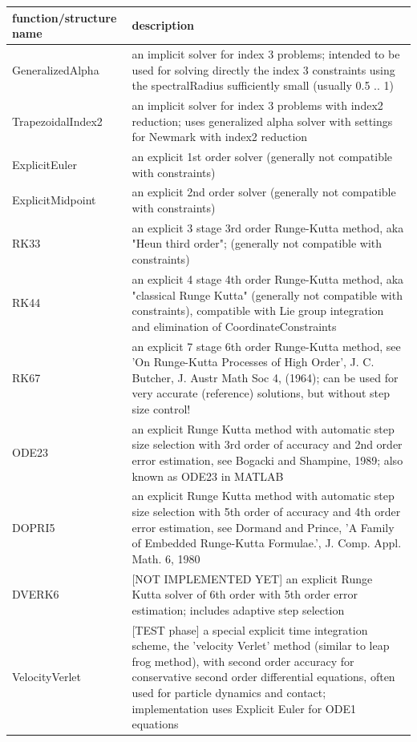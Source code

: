 \begin{center}
\footnotesize
\begin{longtable}{| p{8cm} | p{8cm} |} 
\hline
{\bf function/structure name} & {\bf description}\\ \hline
  GeneralizedAlpha & an implicit solver for index 3 problems; intended to be used for solving directly the index 3 constraints using the spectralRadius sufficiently small (usually 0.5 .. 1)\\ \hline  
  TrapezoidalIndex2 & an implicit solver for index 3 problems with index2 reduction; uses generalized alpha solver with settings for Newmark with index2 reduction\\ \hline  
  ExplicitEuler & an explicit 1st order solver (generally not compatible with constraints)\\ \hline  
  ExplicitMidpoint & an explicit 2nd order solver (generally not compatible with constraints)\\ \hline  
  RK33 & an explicit 3 stage 3rd order Runge-Kutta method, aka "Heun third order"; (generally not compatible with constraints)\\ \hline  
  RK44 & an explicit 4 stage 4th order Runge-Kutta method, aka "classical Runge Kutta" (generally not compatible with constraints), compatible with Lie group integration and elimination of CoordinateConstraints\\ \hline  
  RK67 & an explicit 7 stage 6th order Runge-Kutta method, see 'On Runge-Kutta Processes of High Order', J. C. Butcher, J. Austr Math Soc 4, (1964); can be used for very accurate (reference) solutions, but without step size control!\\ \hline  
  ODE23 & an explicit Runge Kutta method with automatic step size selection with 3rd order of accuracy and 2nd order error estimation, see Bogacki and Shampine, 1989; also known as ODE23 in MATLAB\\ \hline  
  DOPRI5 & an explicit Runge Kutta method with automatic step size selection with 5th order of accuracy and 4th order error estimation, see  Dormand and Prince, 'A Family of Embedded Runge-Kutta Formulae.', J. Comp. Appl. Math. 6, 1980\\ \hline  
  DVERK6 & [NOT IMPLEMENTED YET] an explicit Runge Kutta solver of 6th order with 5th order error estimation; includes adaptive step selection\\ \hline  
  VelocityVerlet & [TEST phase] a special explicit time integration scheme, the 'velocity Verlet' method (similar to leap frog method), with second order accuracy for conservative second order differential equations, often used for particle dynamics and contact; implementation uses Explicit Euler for ODE1 equations\\ \hline  
\end{longtable}
\end{center}

